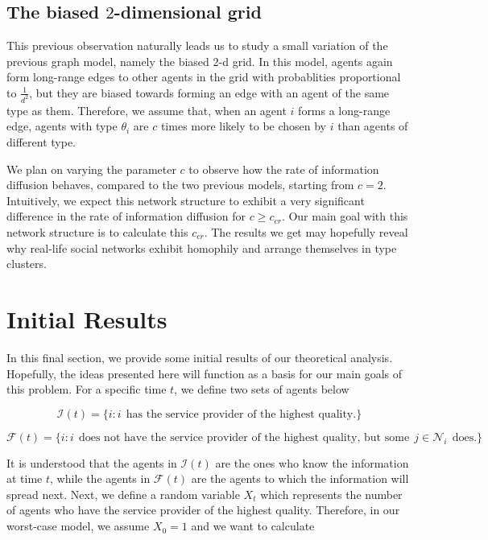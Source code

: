\documentclass[A4paper,11pt]{article}
\begin{document}
\subsection{The biased $2$-dimensional grid}

\par This previous observation naturally leads us to study a small variation of the previous graph model, namely the biased
$2$-d grid. In this model, agents again form long-range edges to other agents in the grid with probablities proportional
to $\frac{1}{d^2}$, but they are biased towards forming an edge with an agent of the same type as them. Therefore, we
assume that, when an agent $i$ forms a long-range edge, agents with type $\theta_i$ are $c$ times more likely to be chosen
by $i$ than agents of different type.

\par We plan on varying the parameter $c$ to observe how the rate of information diffusion behaves, compared to the two
previous models, starting from $c = 2$. Intuitively, we expect this network structure to exhibit a very significant
difference in the rate of information diffusion for $c \geq c_{cr}$. Our main goal with this network structure is to
calculate this $c_{cr}$. The results we get may hopefully reveal why real-life social networks exhibit homophily and
arrange themselves in type clusters.


\section{Initial Results}

\par In this final section, we provide some initial results of our theoretical analysis. Hopefully, the ideas presented
here will function as a basis for our main goals of this problem. For a specific time $t$, we define two sets of agents below

\[
\mathcal{I}(t) = \{ i : i \: \: \text{has the service provider of the highest quality.} \}
\]

\[
\mathcal{F}(t) = \{ i : i \: \: \text{does not have the service provider of the highest quality, but some} \: \: j \in \mathcal{N}_i \: \: \text{does.} \}
\]

\par It is understood that the agents in $\mathcal{I}(t)$ are the ones who know the information at time $t$, while the agents
in $\mathcal{F}(t)$ are the agents to which the information will spread next. Next, we define a random variable $X_t$ which
represents the number of agents who have the service provider of the highest quality. Therefore, in our worst-case model, we
assume $X_0 = 1$ and we want to calculate
\end{document}
